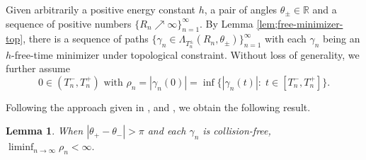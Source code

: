 \documentclass[11pt]{amsart}
\newcommand{\rr}{\mathbb R}
\newcommand{\gm}{\gamma}
\newcommand{\tht}{\theta}
\newcommand{\Lmd}{\Lambda}
\theoremstyle{plain}
\newtheorem{lem}{Lemma}[section]
\theoremstyle{definition}
\theoremstyle{remark}
\begin{document}

Given arbitrarily a positive energy constant $h$, a pair of angles $\tht_{\pm} \in \rr$ and a sequence of positive numbers $\{ R_n \nearrow \infty\}_{n =1}^{\infty}$. By Lemma \ref{lem;free-minimizer-top}, there is a sequence of paths $\{\gm_n  \in \Lmd_{T_n^{\pm}}(R_n, \tht_{\pm})\}_{n=1}^{\infty}$ with each $\gm_n$ being an $h$-free-time minimizer under topological constraint. Without loss of generality, we further assume  
\begin{equation}
    \label{eq;rho-n} 0 \in (T_n^-, T_n^+) \text{ with } \rho_n = |\gm_n(0)| = \inf \{|\gm_n(t)|:\; t \in [T_n^-, T_n^+]\}.
\end{equation}

Following the approach given in \cite{FT00}, \cite{BDT17} and \cite{BBD18}, we obtain the following result.  
\begin{lem} \label{lem;rho-bound}
When $|\tht_+ -\tht_-| >\pi$ and each $\gm_n$ is collision-free, $\liminf_{n \to \infty} \rho_n <\infty.$
\end{lem}
\end{document}
